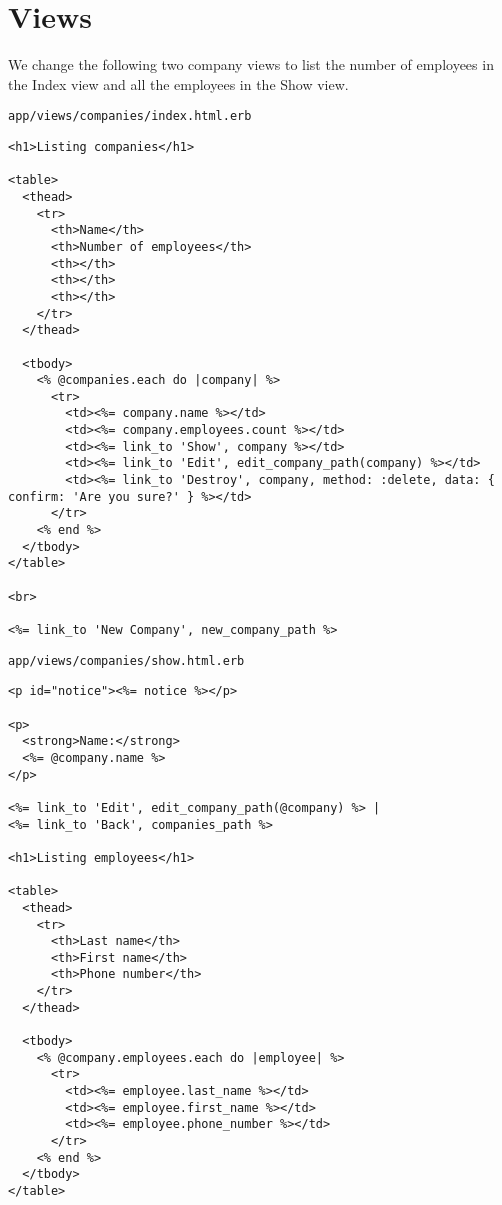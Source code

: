 \documentclass[a4paper]{book}
\newcounter{tab}[chapter]
\begin{document}
\section{Views}\label{views}

We change the following two company views to list the number of employees in the Index view and all the employees in the Show view.

\texttt{app/views/companies/index.html.erb}

\begin{shaded}\begin{verbatim}
<h1>Listing companies</h1>

<table>
  <thead>
    <tr>
      <th>Name</th>
      <th>Number of employees</th>
      <th></th>
      <th></th>
      <th></th>
    </tr>
  </thead>

  <tbody>
    <% @companies.each do |company| %>
      <tr>
        <td><%= company.name %></td>
        <td><%= company.employees.count %></td>
        <td><%= link_to 'Show', company %></td>
        <td><%= link_to 'Edit', edit_company_path(company) %></td>
        <td><%= link_to 'Destroy', company, method: :delete, data: { confirm: 'Are you sure?' } %></td>
      </tr>
    <% end %>
  </tbody>
</table>

<br>

<%= link_to 'New Company', new_company_path %>
\end{verbatim}\end{shaded}

\texttt{app/views/companies/show.html.erb}

\begin{shaded}\begin{verbatim}
<p id="notice"><%= notice %></p>

<p>
  <strong>Name:</strong>
  <%= @company.name %>
</p>

<%= link_to 'Edit', edit_company_path(@company) %> |
<%= link_to 'Back', companies_path %>

<h1>Listing employees</h1>

<table>
  <thead>
    <tr>
      <th>Last name</th>
      <th>First name</th>
      <th>Phone number</th>
    </tr>
  </thead>

  <tbody>
    <% @company.employees.each do |employee| %>
      <tr>
        <td><%= employee.last_name %></td>
        <td><%= employee.first_name %></td>
        <td><%= employee.phone_number %></td>
      </tr>
    <% end %>
  </tbody>
</table>
\end{verbatim}\end{shaded}
\end{document}
